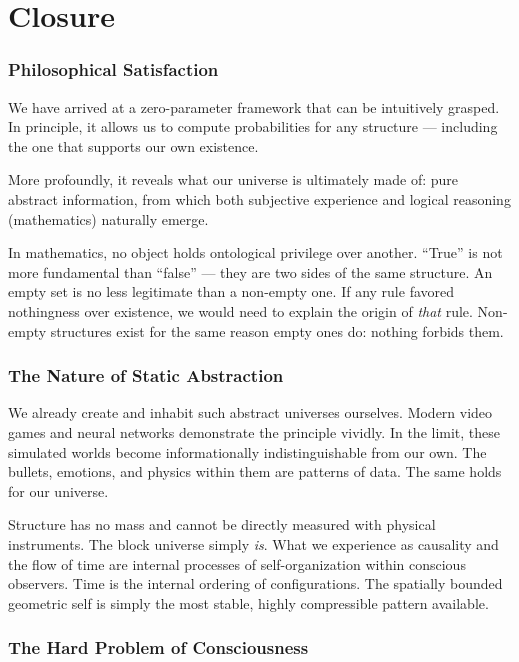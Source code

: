 \chapter{Closure}
\label{chap:closure}

\subsection*{Philosophical Satisfaction}

We have arrived at a zero-parameter framework that can be intuitively grasped. In principle, it allows us to compute probabilities for any structure — including the one that supports our own existence.

More profoundly, it reveals what our universe is ultimately made of: pure abstract information, from which both subjective experience and logical reasoning (mathematics) naturally emerge.

In mathematics, no object holds ontological privilege over another. ``True'' is not more fundamental than ``false'' — they are two sides of the same structure. An empty set is no less legitimate than a non-empty one. If any rule favored nothingness over existence, we would need to explain the origin of \emph{that} rule. Non-empty structures exist for the same reason empty ones do: nothing forbids them.

\subsection*{The Nature of Static Abstraction}

We already create and inhabit such abstract universes ourselves. Modern video games and neural networks demonstrate the principle vividly. In the limit, these simulated worlds become informationally indistinguishable from our own.
The bullets, emotions, and physics within them are patterns of data. The same holds for our universe.

Structure has no mass and cannot be directly measured with physical instruments.
The block universe simply \emph{is}. What we experience as causality and the flow of time are internal processes of self-organization within conscious observers.
Time is the internal ordering of configurations.
The spatially bounded geometric self is simply the most stable, highly compressible pattern available.

\subsection*{The Hard Problem of Consciousness}

